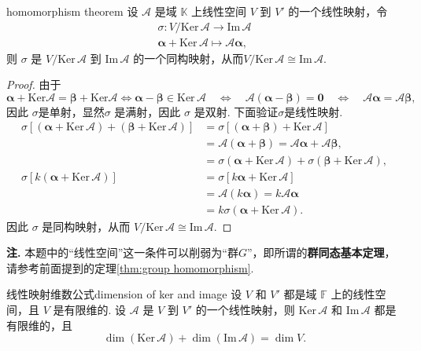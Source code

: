 \documentclass[12pt, a4paper,newtx]{ctexart}
\newenvironment{remark}{\dbend\textbf{注. }}{}{}
\begin{document}
\begin{theorem}{}{homomorphism theorem}
	设 $\mathcal{A}$ 是域 $\mathbb K$ 上线性空间 $V$ 到 $V'$ 的一个线性映射，令\begin{gather*}
			\sigma: V/\text{Ker}\, \mathcal{A} \longrightarrow \text{Im}\, \mathcal{A}\\\bm\alpha + \text{Ker}\, \mathcal{A} \longmapsto \mathcal{A}\bm\alpha,
	\end{gather*}
	则 $\sigma$ 是 $V/\text{Ker}\, \mathcal{A}$ 到 $\text{Im}\, \mathcal{A}$ 的一个同构映射，从而$V/\text{Ker}\, \mathcal{A} \cong \text{Im}\, \mathcal{A}.$
\end{theorem}
\begin{proof}
	由于
	\[
	\bm\alpha + \text{Ker}\mathcal{A} = \bm\beta + \text{Ker}\mathcal{A}\Longleftrightarrow \bm\alpha - \bm\beta \in \text{Ker}\, \mathcal{A} \quad \Longleftrightarrow \quad \mathcal{A}(\bm\alpha - \bm\beta) = \bm 0 \quad \Longleftrightarrow \quad \mathcal{A}\bm\alpha = \mathcal{A}\bm\beta,
	\]
	因此 $\sigma$是单射，显然$\sigma$ 是满射，因此 $\sigma$ 是双射. 下面验证$\sigma$是线性映射. 
	\begin{align*}
		\sigma[(\bm\alpha + \text{Ker}\, \mathcal{A}) + (\bm\beta + \text{Ker}\, \mathcal{A})] &= \sigma[(\bm\alpha + \bm\beta) + \text{Ker}\, \mathcal{A}] \\&= \mathcal{A}(\bm\alpha + \bm\beta) = \mathcal{A}\bm\alpha + \mathcal{A}\bm\beta,\\&= \sigma(\bm\alpha + \text{Ker}\, \mathcal{A}) + \sigma(\bm\beta + \text{Ker}\, \mathcal{A}),\\
		\sigma[k(\bm\alpha + \text{Ker}\, \mathcal{A})] &= \sigma[k\bm\alpha + \text{Ker}\, \mathcal{A}] \\&= \mathcal{A}(k\bm\alpha) = k\mathcal{A}\bm\alpha	\\&= k\sigma(\bm\alpha + \text{Ker}\, \mathcal{A}).
	\end{align*}
	因此 $\sigma$ 是同构映射，从而 $V/\text{Ker}\, \mathcal{A} \cong \text{Im}\, \mathcal{A}$. 
\end{proof}
\begin{remark}
	本题中的“线性空间”这一条件可以削弱为“群$G$”，即所谓的\textbf{群同态基本定理}，请参考前面提到的定理\ref{thm:group homomorphism}. 
\end{remark}
\begin{theorem}{线性映射维数公式}{dimension of ker and image}
	设 $V$ 和 $V'$ 都是域 $\mathbb F$ 上的线性空间，且 $V$ 是有限维的. 设 $\mathcal{A}$ 是 $V$ 到 $V'$ 的一个线性映射，则 $\text{Ker}\, \mathcal{A}$ 和 $\text{Im}\, \mathcal{A}$ 都是有限维的，且
	\[
	\dim(\text{Ker}\, \mathcal{A}) + \dim(\text{Im}\, \mathcal{A}) = \dim V. 
	\]
\end{theorem}
\end{document}
